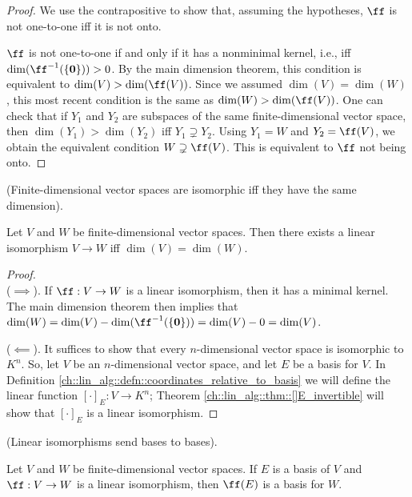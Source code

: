 \begin{proof}
    We use the contrapositive to show that, assuming the hypotheses, $\ff$ is not one-to-one iff it is not onto.
    
    $\ff$ is not one-to-one if and only if it has a nonminimal kernel, i.e., iff $\dim(\ff^{-1}(\{\mathbf{0}\})) > 0$. By the main dimension theorem, this condition is equivalent to $\dim(V) > \dim(\ff(V))$. Since we assumed $\dim(V) = \dim(W)$, this most recent condition is the same as $\dim(W) > \dim(\ff(V))$. One can check that if $Y_1$ and $Y_2$ are subspaces of the same finite-dimensional vector space, then $\dim(Y_1) > \dim(Y_2)$ iff $Y_1 \supsetneq Y_2$. Using $Y_1 = W$ and $Y_2 = \ff(V)$, we obtain the equivalent condition $W \supsetneq \ff(V)$. This is equivalent to $\ff$ not being onto.
\end{proof}

\begin{theorem}
\label{ch::lin_alg::thm::same_dim_iff_isomorphic}
    (Finite-dimensional vector spaces are isomorphic iff they have the same dimension).
    
    Let $V$ and $W$ be finite-dimensional vector spaces. Then there exists a linear isomorphism $V \rightarrow W$ iff $\dim(V) = \dim(W)$.
\end{theorem}

\begin{proof}
    \mbox{} \\ \indent
    ($\implies$). If $\ff:V \rightarrow W$ is a linear isomorphism, then it has a minimal kernel. The main dimension theorem then implies that $\dim(W) = \dim(V) - \dim(\ff^{-1}(\{\mathbf{0}\})) = \dim(V) - 0 = \dim(V)$.
    
    ($\impliedby$). It suffices to show that every $n$-dimensional vector space is isomorphic to $K^n$. So, let $V$ be an $n$-dimensional vector space, and let $E$ be a basis for $V$. In Definition \ref{ch::lin_alg::defn::coordinates_relative_to_basis} we will define the linear function $[\cdot]_E:V \rightarrow K^n$; Theorem \ref{ch::lin_alg::thm::[]E_invertible} will show that $[\cdot]_E$ is a linear isomorphism.
\end{proof}

\begin{theorem}
    \label{ch::lin_alg::thm::iso_bases_to_bases}
    (Linear isomorphisms send bases to bases).

    Let $V$ and $W$ be finite-dimensional vector spaces. If $E$ is a basis of $V$ and $\ff:V \rightarrow W$ is a linear isomorphism, then $\ff(E)$ is a basis for $W$.
\end{theorem}

